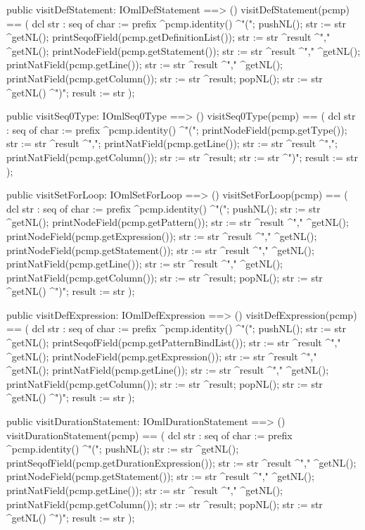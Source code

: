 \begin{vdm_al}
  public visitDefStatement: IOmlDefStatement ==> ()
  visitDefStatement(pcmp) ==
    ( dcl str : seq of char := prefix ^pcmp.identity() ^"(";
      pushNL();
      str := str ^getNL();
      printSeqofField(pcmp.getDefinitionList());
      str := str ^result ^"," ^getNL();
      printNodeField(pcmp.getStatement());
      str := str ^result ^"," ^getNL();
      printNatField(pcmp.getLine());
      str := str ^result ^"," ^getNL();
      printNatField(pcmp.getColumn());
      str := str ^result;
      popNL();
      str := str ^getNL() ^")";
      result := str );

  public visitSeq0Type: IOmlSeq0Type ==> ()
  visitSeq0Type(pcmp) ==
    ( dcl str : seq of char := prefix ^pcmp.identity() ^"(";
      printNodeField(pcmp.getType());
      str := str ^result ^",";
      printNatField(pcmp.getLine());
      str := str ^result ^",";
      printNatField(pcmp.getColumn());
      str := str ^result;
      str := str ^")";
      result := str );

  public visitSetForLoop: IOmlSetForLoop ==> ()
  visitSetForLoop(pcmp) ==
    ( dcl str : seq of char := prefix ^pcmp.identity() ^"(";
      pushNL();
      str := str ^getNL();
      printNodeField(pcmp.getPattern());
      str := str ^result ^"," ^getNL();
      printNodeField(pcmp.getExpression());
      str := str ^result ^"," ^getNL();
      printNodeField(pcmp.getStatement());
      str := str ^result ^"," ^getNL();
      printNatField(pcmp.getLine());
      str := str ^result ^"," ^getNL();
      printNatField(pcmp.getColumn());
      str := str ^result;
      popNL();
      str := str ^getNL() ^")";
      result := str );

  public visitDefExpression: IOmlDefExpression ==> ()
  visitDefExpression(pcmp) ==
    ( dcl str : seq of char := prefix ^pcmp.identity() ^"(";
      pushNL();
      str := str ^getNL();
      printSeqofField(pcmp.getPatternBindList());
      str := str ^result ^"," ^getNL();
      printNodeField(pcmp.getExpression());
      str := str ^result ^"," ^getNL();
      printNatField(pcmp.getLine());
      str := str ^result ^"," ^getNL();
      printNatField(pcmp.getColumn());
      str := str ^result;
      popNL();
      str := str ^getNL() ^")";
      result := str );

  public visitDurationStatement: IOmlDurationStatement ==> ()
  visitDurationStatement(pcmp) ==
    ( dcl str : seq of char := prefix ^pcmp.identity() ^"(";
      pushNL();
      str := str ^getNL();
      printSeqofField(pcmp.getDurationExpression());
      str := str ^result ^"," ^getNL();
      printNodeField(pcmp.getStatement());
      str := str ^result ^"," ^getNL();
      printNatField(pcmp.getLine());
      str := str ^result ^"," ^getNL();
      printNatField(pcmp.getColumn());
      str := str ^result;
      popNL();
      str := str ^getNL() ^")";
      result := str );


\end{vdm_al}
